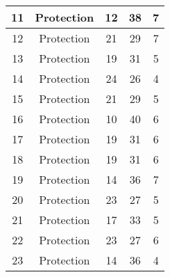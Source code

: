 \documentclass[results.tex]{subfiles}
\begin{document}
\begin{center}
\begin{tabular}{| c || c | c | c | c |}
            \hline
            11                      & Protection                   & 12                     & 38                      & 7                    \\
            \hline
            12                      & Protection                   & 21                     & 29                      & 7                    \\
            \hline
            13                      & Protection                   & 19                     & 31                      & 5                    \\
            \hline
            14                      & Protection                   & 24                     & 26                      & 4                    \\
            \hline
            15                      & Protection                   & 21                     & 29                      & 5                    \\
            \hline
            16                      & Protection                   & 10                     & 40                      & 6                    \\
            \hline
            17                      & Protection                   & 19                     & 31                      & 6                    \\
            \hline
            18                      & Protection                   & 19                     & 31                      & 6                    \\
            \hline
            19                      & Protection                   & 14                     & 36                      & 7                    \\
            \hline
            20                      & Protection                   & 23                     & 27                      & 5                    \\
            \hline
            21                      & Protection                   & 17                     & 33                      & 5                    \\
            \hline
            22                      & Protection                   & 23                     & 27                      & 6                    \\
            \hline
            23                      & Protection                   & 14                     & 36                      & 4                    \\

\end{tabular}
\end{center}
\end{document}
